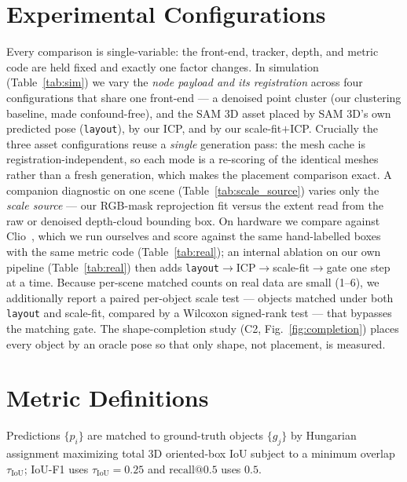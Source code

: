 \documentclass[conference]{IEEEtran}
\begin{document}
\section{Experimental Configurations}
\label{app:config}
Every comparison is single-variable: the front-end, tracker, depth, and metric
code are held fixed and exactly one factor changes. In simulation
(Table~\ref{tab:sim}) we vary the \emph{node payload and its registration}
across four configurations that share one front-end --- a denoised point cluster
(our clustering baseline, made confound-free), and the SAM 3D asset placed by
SAM 3D's own predicted pose (\texttt{layout}), by our ICP, and by our
scale-fit${+}$ICP. Crucially the three asset configurations reuse a \emph{single}
generation pass: the mesh cache is registration-independent, so each mode is a
re-scoring of the identical meshes rather than a fresh generation, which makes
the placement comparison exact. A companion diagnostic on one scene
(Table~\ref{tab:scale_source}) varies only the \emph{scale source} --- our
RGB-mask reprojection fit versus the extent read from the raw or denoised
depth-cloud bounding box. On hardware we compare against Clio~\cite{clio}, which
we run ourselves and score against the same hand-labelled boxes with the same
metric code (Table~\ref{tab:real}); an internal ablation on our own
pipeline (Table~\ref{tab:real}) then adds
\texttt{layout}$\rightarrow$ICP$\rightarrow$scale-fit$\rightarrow$gate one step
at a time. Because per-scene matched counts on real data are small (1--6), we
additionally report a paired per-object scale test --- objects matched under
both \texttt{layout} and scale-fit, compared by a Wilcoxon signed-rank test ---
that bypasses the matching gate. The shape-completion study
(C2, Fig.~\ref{fig:completion}) places every object by an oracle pose so that
only shape, not placement, is measured.

\section{Metric Definitions}
\label{app:metrics}
Predictions $\{p_i\}$ are matched to ground-truth objects $\{g_j\}$ by Hungarian
assignment maximizing total 3D oriented-box IoU subject to a minimum overlap
$\tau_{\text{IoU}}$; IoU-F1 uses $\tau_{\text{IoU}}=0.25$ and $\text{recall@}0.5$
uses $0.5$.
\end{document}
